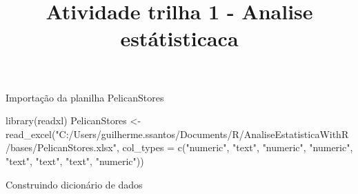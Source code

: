 \documentclass[
]{article}
\title{Atividade trilha 1 - Analise estátisticaca}
\author{}
\date{\vspace{-2.5em}}
\newenvironment{Shaded}{\begin{snugshade}}{\end{snugshade}}
\newcommand{\AttributeTok}[1]{\textcolor[rgb]{0.77,0.63,0.00}{#1}}
\newcommand{\FunctionTok}[1]{\textcolor[rgb]{0.00,0.00,0.00}{#1}}
\newcommand{\NormalTok}[1]{#1}
\newcommand{\OtherTok}[1]{\textcolor[rgb]{0.56,0.35,0.01}{#1}}
\newcommand{\StringTok}[1]{\textcolor[rgb]{0.31,0.60,0.02}{#1}}
\begin{document}
\maketitle

Importação da planilha PelicanStores

\begin{Shaded}
\begin{Highlighting}[]
\FunctionTok{library}\NormalTok{(readxl)}
\NormalTok{PelicanStores }\OtherTok{\textless{}{-}} \FunctionTok{read\_excel}\NormalTok{(}\StringTok{"C:/Users/guilherme.ssantos/Documents/R/AnaliseEstatisticaWithR/bases/PelicanStores.xlsx"}\NormalTok{, }
    \AttributeTok{col\_types =} \FunctionTok{c}\NormalTok{(}\StringTok{"numeric"}\NormalTok{, }\StringTok{"text"}\NormalTok{, }\StringTok{"numeric"}\NormalTok{, }
        \StringTok{"numeric"}\NormalTok{, }\StringTok{"text"}\NormalTok{, }\StringTok{"text"}\NormalTok{, }\StringTok{"text"}\NormalTok{, }
        \StringTok{"numeric"}\NormalTok{))}
\end{Highlighting}
\end{Shaded}

Construindo dicionário de dados
\end{document}

